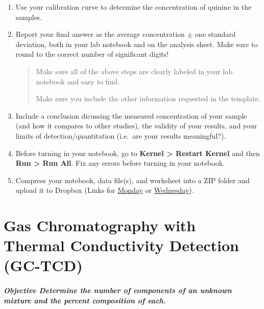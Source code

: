 \documentclass[]{tufte-book}
\begin{document}
\begin{enumerate}
  \begin{marginfigure}
   The percent difference between the measured and known concentration of
   your QC should be \textless5\%
   \end{marginfigure}
\item
  Use your calibration curve to determine the concentration of quinine in the samples.\\
\item
  Report your final answer as the average concentration \(\pm\) one standard deviation, both in your lab notebook and on the analysis sheet. Make sure to round to the correct number of significant digits!

  \begin{quote}
  Make sure all of the above steps are clearly labeled in your lab notebook and easy to find.

  Make sure you include the other information requested in the template.
  \end{quote}
\item
  Include a conclusion dicussing the measured concentration of your sample (and how it compares to other studies), the validity of your results, and your limits of detection/quantitation (i.e.~are your results meaningful?).
\item
  Before turning in your notebook, go to \textbf{Kernel \textgreater{} Restart Kernel} and then \textbf{Run \textgreater{} Run All}. Fix any errors before turning in your notebook.
\item
  Compress your notebook, data file(s), and worksheet into a ZIP folder and upload it to Dropbox (Links for \href{https://alphonse.github.io/devel/chem370/assignments/submissions-monday.html}{Monday} or \href{https://alphonse.github.io/devel/chem370/assignments/submissions-wednesday.html}{Wednesday}).
\end{enumerate}

\hypertarget{gas-chromatography-with-thermal-conductivity-detection-gc-tcd}{%
\chapter{Gas Chromatography with Thermal Conductivity Detection (GC-TCD)}\label{gas-chromatography-with-thermal-conductivity-detection-gc-tcd}}

\hypertarget{objective-determine-the-number-of-components-of-an-unknown-mixture-and-the-percent-composition-of-each.}{%
\paragraph{\texorpdfstring{\textbf{Objective} \textbar{} Determine the number of components of an unknown mixture and the percent composition of each.}{Objective \textbar{} Determine the number of components of an unknown mixture and the percent composition of each.}}\label{objective-determine-the-number-of-components-of-an-unknown-mixture-and-the-percent-composition-of-each.}}
\end{document}
